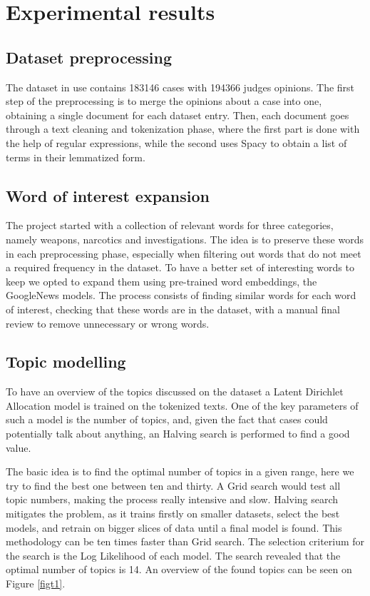 \section{Experimental results}

\subsection{Dataset preprocessing}

The dataset in use contains 183146 cases with 194366 judges opinions. 
The first step of the preprocessing is to merge the opinions about a 
case into one, obtaining a single document for each dataset entry.  
Then, each document goes through a text cleaning and tokenization phase, 
where the first part is done with the help of regular expressions, 
while the second uses Spacy to obtain a list of terms in their lemmatized form.

\subsection{Word of interest expansion}

The project started with a collection of relevant words for three categories, 
namely weapons, narcotics and investigations. The idea is to preserve these words
in each preprocessing phase, especially when filtering out words 
that do not meet a required frequency in the dataset. 
To have a better set of interesting words to keep we opted to expand them 
using pre-trained word embeddings, the GoogleNews models.
The process consists of finding similar words for each word 
of interest, checking that these words are in the dataset, 
with a manual final review to remove unnecessary or wrong words.

\subsection{Topic modelling}

To have an overview of the topics discussed on the dataset a Latent 
Dirichlet Allocation model is trained on the tokenized texts.
One of the key parameters of such a model is the number of topics, and, 
given the fact that cases could potentially talk about anything, an 
Halving search is performed to find a good value.

\noindent The basic idea is to find the optimal number of topics in a given range, 
here we try to find the best one between ten and thirty. A Grid search would 
test all topic numbers, making the process really intensive and slow. 
Halving search 
mitigates the problem, as it trains firstly on smaller datasets, select 
the best models, and retrain on bigger slices of data until a final model 
is found. This methodology can be ten times faster than Grid search. 
The selection criterium for the search is the Log Likelihood of each model.
The search revealed that the optimal number of topics is 14. An overview of the found topics 
can be seen on Figure \vref{figt1}.

